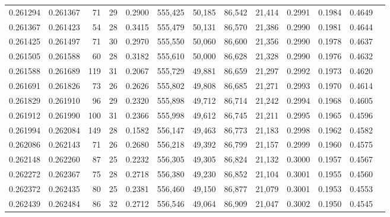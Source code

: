 \begin{tabular}{rrrrrrrrrrrrr}
0.261294 & 0.261367 &  71 &  29 &                                     0.2900 & 555,425 &  50,185 &  86,542 &  21,414 & 0.2991 & 0.1984 & 0.4649 \\
0.261367 & 0.261423 &  54 &  28 &                                     0.3415 & 555,479 &  50,131 &  86,570 &  21,386 & 0.2990 & 0.1981 & 0.4644 \\
0.261425 & 0.261497 &  71 &  30 &                                     0.2970 & 555,550 &  50,060 &  86,600 &  21,356 & 0.2990 & 0.1978 & 0.4637 \\
0.261505 & 0.261588 &  60 &  28 &                                     0.3182 & 555,610 &  50,000 &  86,628 &  21,328 & 0.2990 & 0.1976 & 0.4632 \\
0.261588 & 0.261689 & 119 &  31 &                                     0.2067 & 555,729 &  49,881 &  86,659 &  21,297 & 0.2992 & 0.1973 & 0.4620 \\
0.261691 & 0.261826 &  73 &  26 &                                     0.2626 & 555,802 &  49,808 &  86,685 &  21,271 & 0.2993 & 0.1970 & 0.4614 \\
0.261829 & 0.261910 &  96 &  29 &                                     0.2320 & 555,898 &  49,712 &  86,714 &  21,242 & 0.2994 & 0.1968 & 0.4605 \\
0.261912 & 0.261990 & 100 &  31 &                                     0.2366 & 555,998 &  49,612 &  86,745 &  21,211 & 0.2995 & 0.1965 & 0.4596 \\
0.261994 & 0.262084 & 149 &  28 &                                     0.1582 & 556,147 &  49,463 &  86,773 &  21,183 & 0.2998 & 0.1962 & 0.4582 \\
0.262086 & 0.262143 &  71 &  26 &                                     0.2680 & 556,218 &  49,392 &  86,799 &  21,157 & 0.2999 & 0.1960 & 0.4575 \\
0.262148 & 0.262260 &  87 &  25 &                                     0.2232 & 556,305 &  49,305 &  86,824 &  21,132 & 0.3000 & 0.1957 & 0.4567 \\
0.262272 & 0.262367 &  75 &  28 &                                     0.2718 & 556,380 &  49,230 &  86,852 &  21,104 & 0.3001 & 0.1955 & 0.4560 \\
0.262372 & 0.262435 &  80 &  25 &                                     0.2381 & 556,460 &  49,150 &  86,877 &  21,079 & 0.3001 & 0.1953 & 0.4553 \\
0.262439 & 0.262484 &  86 &  32 &                                     0.2712 & 556,546 &  49,064 &  86,909 &  21,047 & 0.3002 & 0.1950 & 0.4545 \\

\end{tabular}
